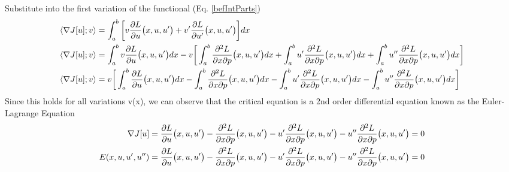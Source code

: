 \documentclass[12pt,3p]{article}
\numberwithin{equation}{section}
\begin{document}
Substitute into the first variation of the functional (Eq. \ref{befIntParts})
\begin{align}\label{aftIntParts}
\begin{split}
\langle \nabla J[u]; v\rangle &= \int_a^b \bigg[ v \pdv{L}{u} \big(x, u, u' \big) + v' \pdv{L}{u'} \big( x, u, u' \big) \bigg] dx \\
\langle \nabla J[u]; v\rangle &= \int_a^b v \pdv{L}{u} \big(x, u, u' \big) dx - v \bigg[ \int_a^b \pdv[2]{L}{x}{p} \big(x, u, u' \big) dx + \int_a^b u' \pdv[2]{L}{x}{p} \big(x, u, u' \big) dx + \int_a^b u'' \pdv[2]{L}{x}{p} \big(x, u, u' \big) dx \bigg] \\
\langle \nabla J[u]; v\rangle &= v \bigg[ \int_a^b \pdv{L}{u} \big(x, u, u' \big) dx - \int_a^b \pdv[2]{L}{x}{p} \big(x, u, u' \big) dx - \int_a^b u' \pdv[2]{L}{x}{p} \big(x, u, u' \big) dx - \int_a^b u'' \pdv[2]{L}{x}{p} \big(x, u, u' \big) dx \bigg]
\end{split}
\end{align}
Since this holds for all variations v(x), we can observe that the critical equation is a 2nd order differential equation known as the Euler-Lagrange Equation
\begin{align}\label{eulerLagrange}
\begin{split}
\nabla J [u] &= \pdv{L}{u} \big(x, u, u' \big) - \pdv[2]{L}{x}{p} \big(x, u, u' \big) - u' \pdv[2]{L}{x}{p} \big(x, u, u' \big) - u'' \pdv[2]{L}{x}{p} \big(x, u, u' \big) = 0 \\
E(x, u, u', u'') &= \pdv{L}{u} \big(x, u, u' \big) - \pdv[2]{L}{x}{p} \big(x, u, u' \big) - u' \pdv[2]{L}{x}{p} \big(x, u, u' \big) - u'' \pdv[2]{L}{x}{p} \big(x, u, u' \big) = 0 
\end{split}
\end{align}
\end{document}
